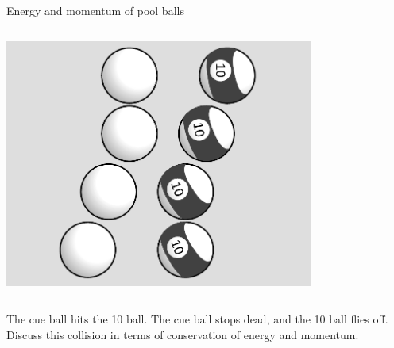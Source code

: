 \begin{frame}{Energy and momentum of pool balls}


  \begin{mycolumns}

    \begin{column}{.4\textwidth}\includegraphics[width=4in]{ch06/figs/pool-balls-energy-momentum}\end{column}

    \begin{column}{.6\textwidth}

      The cue ball hits the 10 ball. The cue ball stops dead, and the 10 ball flies off.
      Discuss this collision in terms of conservation of energy and momentum.

    \end{column}
  \end{mycolumns}

\end{frame}

